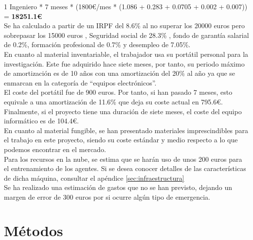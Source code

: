 \documentclass[11pt,fleqn]{book} %
\begin{document}
\newpage

1 Ingeniero * 7 meses * (1800\euro/mes * (1.086 + 0.283 + 0.0705 + 0.002 + 0.007)) = \textbf{18251.1\euro} \\

Se ha calculado a partir de un IRPF del 8.6\% al no superar los 20000 euros pero sobrepasar los 15000 euros \cite{article:irpf}, Seguridad social de 28.3\% \cite{article:seguridadsocial}, fondo de garantía salarial de 0.2\%, formación profesional de 0.7\% y desempleo de 7.05\%. \\

En cuanto al material inventariable, el trabajador usa su portátil personal para la investigación. Este fue adquirido hace siete meses, por tanto, su periodo máximo de amortización es de 10 años con una amortización del 20\% al año ya que se enmarcan en la categoría de ``equipos electrónicos''. \cite{article:amortizacion}\\

El coste del portátil fue de 900 euros. Por tanto, si han pasado 7 meses, esto equivale a una amortización de 11.6\% que deja su coste actual en 795.6\euro. Finalmente, si el proyecto tiene una duración de siete meses, el coste del equipo informático es de 104.4\euro. \\

En cuanto al material fungible, se han presentado materiales imprescindibles para el trabajo en este proyecto, siendo su coste estándar y medio respecto a lo que podemos encontrar en el mercado. \\

Para los recursos en la nube, se estima que se harán uso de unos 200 euros para el entrenamiento de los agentes. Si se desea conocer detalles de las características de dicha máquina, consultar el apéndice \ref{sec:infraestructura} \\

Se ha realizado una estimación de gastos que no se han previsto, dejando un margen de error de 300 euros por si ocurre algún tipo de emergencia.


\part{Métodos}

\end{document}
